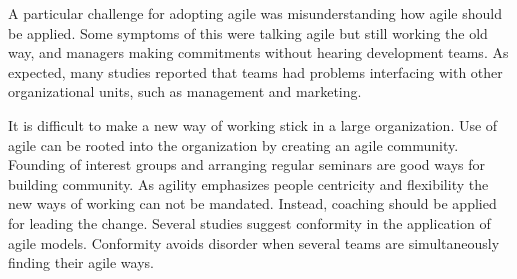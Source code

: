 \documentclass[lnbip]{svmultln}
\begin{document}
A particular challenge for adopting agile was misunderstanding how agile should
be applied. Some symptoms of this were talking agile but still working the old
way, and managers making commitments without hearing development teams.
As expected, many studies reported that teams had problems interfacing with
other organizational units, such as management and marketing.

It is difficult to make a new way of working stick in a large organization.
Use of agile can be rooted into the organization by creating an agile community.
Founding of interest groups and arranging regular seminars are good ways for
building community. As agility emphasizes people centricity and flexibility the
new ways of working can not be mandated. Instead, coaching should be applied for
leading the change. Several studies suggest conformity in the application of
agile models. Conformity avoids disorder when several teams are simultaneously
finding their agile ways.
\end{document}
